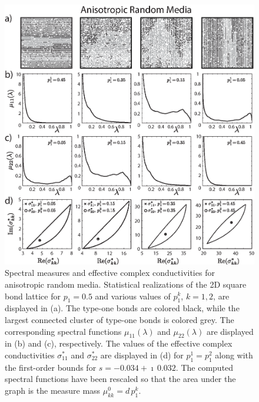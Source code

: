 \documentclass{cmslatex}
\begin{document}
%
\begin{figure}[t]
  \centerline{\includegraphics[scale=0.74]{Anisotropic_RRN_p=0_5.eps}} 
\caption{Spectral measures and effective complex conductivities for
  anisotropic random media. Statistical realizations of the 2D square
  bond lattice for $p_1=0.5$ and various values of $p_1^k$, $k=1,2$,
  are displayed in (a). The type-one bonds are colored black, while
  the largest connected cluster of type-one bonds is colored grey. The
  corresponding spectral functions $\mu_{11}(\lambda)$ and $\mu_{22}(\lambda)$ are
  displayed in (b) and (c), respectively. The values of the
  effective complex conductivities $\sigma^*_{11}$ and $\sigma^*_{22}$ are
  displayed in (d) for $p_1^1=p_1^2$ along with the first-order
  bounds for $s=-0.034+\imath\,0.032$. The computed spectral functions have
  been rescaled so that   the area under the graph is the measure mass
  $\mu^0_{kk}=d\,p_1^k$.     
        }
\label{fig:Anisotropic_Spectral_Measures}
\end{figure}
%
\end{document}
